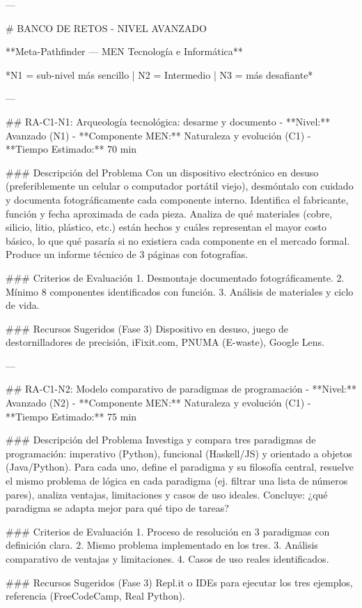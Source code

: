 ---

# BANCO DE RETOS - NIVEL AVANZADO

**Meta-Pathfinder — MEN Tecnología e Informática**

*N1 = sub-nivel más sencillo | N2 = Intermedio | N3 = más desafiante*

---

## RA-C1-N1: Arqueología tecnológica: desarme y documento
- **Nivel:** Avanzado (N1)
- **Componente MEN:** Naturaleza y evolución (C1)
- **Tiempo Estimado:** 70 min

### Descripción del Problema
Con un dispositivo electrónico en desuso (preferiblemente un celular o computador portátil viejo), desmóntalo con cuidado y documenta fotográficamente cada componente interno. Identifica el fabricante, función y fecha aproximada de cada pieza. Analiza de qué materiales (cobre, silicio, litio, plástico, etc.) están hechos y cuáles representan el mayor costo básico, lo que qué pasaría si no existiera cada componente en el mercado formal. Produce un informe técnico de 3 páginas con fotografías.

### Criterios de Evaluación
1. Desmontaje documentado fotográficamente. 2. Mínimo 8 componentes identificados con función. 3. Análisis de materiales y ciclo de vida.

### Recursos Sugeridos (Fase 3)
Dispositivo en desuso, juego de destornilladores de precisión, iFixit.com, PNUMA (E-waste), Google Lens.

---

## RA-C1-N2: Modelo comparativo de paradigmas de programación
- **Nivel:** Avanzado (N2)
- **Componente MEN:** Naturaleza y evolución (C1)
- **Tiempo Estimado:** 75 min

### Descripción del Problema
Investiga y compara tres paradigmas de programación: imperativo (Python), funcional (Haskell/JS) y orientado a objetos (Java/Python). Para cada uno, define el paradigma y su filosofía central, resuelve el mismo problema de lógica en cada paradigma (ej. filtrar una lista de números pares), analiza ventajas, limitaciones y casos de uso ideales. Concluye: ¿qué paradigma se adapta mejor para qué tipo de tareas?

### Criterios de Evaluación
1. Proceso de resolución en 3 paradigmas con definición clara. 2. Mismo problema implementado en los tres. 3. Análisis comparativo de ventajas y limitaciones. 4. Casos de uso reales identificados.

### Recursos Sugeridos (Fase 3)
Repl.it o IDEs para ejecutar los tres ejemplos, referencia (FreeCodeCamp, Real Python).

